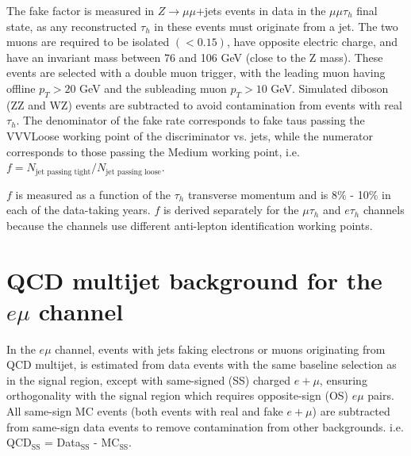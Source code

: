 The fake factor is measured in $Z \rightarrow \mu\mu$+jets events in data in the $\mu\mu\tau_{h}$ final state, as any reconstructed $\tau_{h}$ in these events must originate from a jet. The two muons are required to be isolated $(<0.15)$, have opposite electric charge, and have an invariant mass between 76 and 106 GeV (close to the Z mass). These events are selected with a double muon trigger, with the leading muon having offline $p_T > 20$ GeV and the subleading muon $p_{T} > 10$ GeV. Simulated diboson (ZZ and WZ) events are subtracted to avoid contamination from events with real $\tau_{h}$. The denominator of the fake rate corresponds to fake taus passing the VVVLoose working point of the discriminator vs. jets, while the numerator corresponds to those passing the Medium working point, i.e. $f = N_{\text{jet passing tight}}/ N_{\text{jet passing loose}}$.

$f$ is measured as a function of the $\tau_{h}$ transverse momentum and is 8\% - 10\% in each of the data-taking years. $f$ is derived separately for the $\mu\tau_{h}$ and $e\tau_{h}$ channels because the channels use different anti-lepton identification working points.

\section{QCD multijet background for the $e\mu$ channel}
\label{section:ch-9-QCD-multijet-background}
In the $e\mu$ channel, events with jets faking electrons or muons originating from QCD multijet, is estimated from data events with the same baseline selection as in the signal region, except with same-signed (SS) charged $e+\mu$, ensuring orthogonality with the signal region which requires opposite-sign (OS) $e\mu$ pairs. All same-sign MC events (both events with real and fake $e+\mu$) are subtracted from same-sign data events to remove contamination from other backgrounds. i.e. QCD$_{\text{SS}}$ = Data$_{\text{SS}}$ - MC$_{\text{SS}}$.

